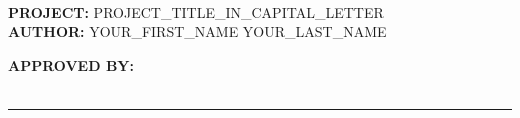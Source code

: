 \newpage
{}
{}
\thispagestyle{empty}
\text{} \\
\textbf{PROJECT:} PROJECT\_TITLE\_IN\_CAPITAL\_LETTER\\[0.2cm]
\textbf{AUTHOR:} YOUR\_FIRST\_NAME YOUR\_LAST\_NAME

\vspace{6in}
\hfill \textbf{APPROVED BY:}\\ \\
\vspace{2cm}
\hfill \noindent\rule{6cm}{0.4pt}